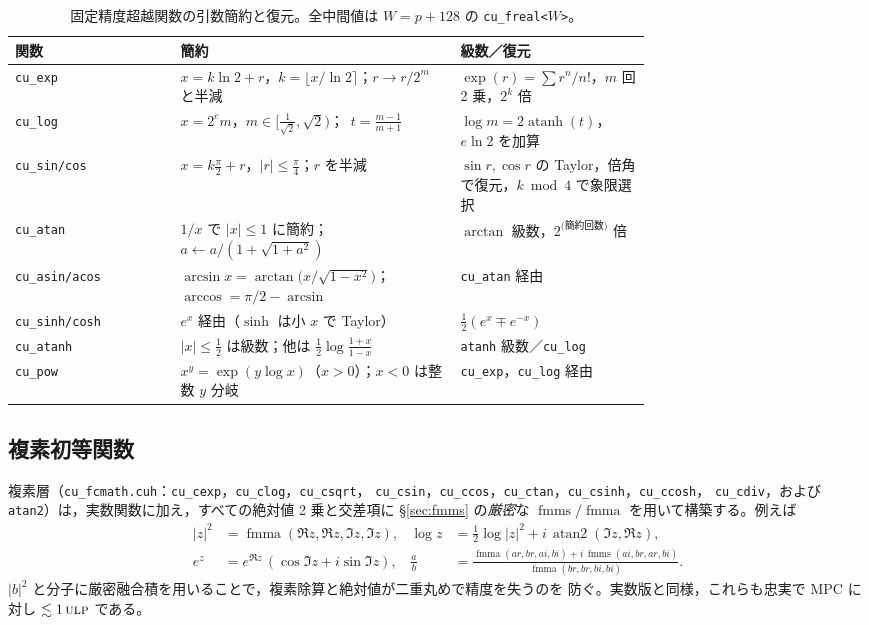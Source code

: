 \documentclass[uplatex,dvipdfmx,a4paper,11pt]{jsarticle}
\newcommand{\code}[1]{\texttt{#1}}
\newcommand{\PB}{\ensuremath{p}}
\newcommand{\ulp}{\textsc{ulp}}
\newcommand{\fmma}{\ensuremath{\operatorname{fmma}}}
\newcommand{\fmms}{\ensuremath{\operatorname{fmms}}}
\begin{document}
\begin{table}[h]
\centering
\renewcommand{\arraystretch}{1.2}
\begin{tabular}{@{}lp{0.44\linewidth}p{0.30\linewidth}@{}}
\toprule
関数 & 簡約 & 級数／復元\\
\midrule
\code{cu\_exp} & $x = k\ln 2 + r$，$k=\lfloor x/\ln2\rceil$；$r\!\to\!r/2^{m}$ と半減 & $\exp(r)=\sum r^n/n!$，$m$ 回 2 乗，$2^{k}$ 倍\\
\code{cu\_log} & $x=2^{e}m$，$m\in[\tfrac{1}{\sqrt2},\sqrt2)$；\ $t=\frac{m-1}{m+1}$ & $\log m = 2\operatorname{atanh}(t)$，$e\ln2$ を加算\\
\code{cu\_sin/cos} & $x=k\frac{\pi}{2}+r$，$|r|\le\frac{\pi}{4}$；$r$ を半減 & $\sin r,\cos r$ の Taylor，倍角で復元，$k\bmod4$ で象限選択\\
\code{cu\_atan} & $1/x$ で $|x|\le1$ に簡約；$a\leftarrow a/(1+\sqrt{1+a^2})$ & $\arctan$ 級数，$2^{\text{(簡約回数)}}$ 倍\\
\code{cu\_asin/acos} & $\arcsin x=\arctan\!\big(x/\sqrt{1-x^2}\big)$；$\arccos = \pi/2-\arcsin$ & \code{cu\_atan} 経由\\
\code{cu\_sinh/cosh} & $e^{x}$ 経由（$\sinh$ は小 $x$ で Taylor） & $\tfrac12(e^x\mp e^{-x})$\\
\code{cu\_atanh} & $|x|\le\tfrac12$ は級数；他は $\tfrac12\log\frac{1+x}{1-x}$ & \code{atanh} 級数／\code{cu\_log}\\
\code{cu\_pow} & $x^y=\exp(y\log x)$（$x>0$）；$x<0$ は整数 $y$ 分岐 & \code{cu\_exp}，\code{cu\_log} 経由\\
\bottomrule
\end{tabular}
\caption{固定精度超越関数の引数簡約と復元。全中間値は $W=\PB+128$ の
\code{cu\_freal<$W$>}。}
\label{tab:trans}
\end{table}

\subsection{複素初等関数}
複素層（\code{cu\_fcmath.cuh}：\code{cu\_cexp}，\code{cu\_clog}，\code{cu\_csqrt}，
\code{cu\_csin}，\code{cu\_ccos}，\code{cu\_ctan}，\code{cu\_csinh}，\code{cu\_ccosh}，
\code{cu\_cdiv}，および \code{atan2}）は，実数関数に加え，すべての絶対値 2 乗と交差項に
\S\ref{sec:fmms} の\emph{厳密}な $\fmms/\fmma$ を用いて構築する。例えば
\begin{align}
|z|^2 &= \fmma(\Re z,\Re z,\Im z,\Im z), &
\log z &= \tfrac12\log|z|^2 + i\,\operatorname{atan2}(\Im z,\Re z),\\
e^{z} &= e^{\Re z}\,(\cos\Im z + i\sin\Im z), &
\tfrac{a}{b} &= \frac{\fmma(ar,br,ai,bi) + i\,\fmms(ai,br,ar,bi)}{\fmma(br,br,bi,bi)} .
\end{align}
$|b|^2$ と分子に厳密融合積を用いることで，複素除算と絶対値が二重丸めで精度を失うのを
防ぐ。実数版と同様，これらも忠実で MPC に対し $\lesssim 1\,\ulp$ である。
\end{document}

